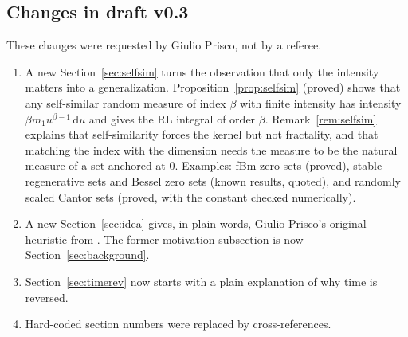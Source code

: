 \documentclass[11pt]{article}
\theoremstyle{remark}
\theoremstyle{definition}
\newcommand{\dd}{\,\mathrm{d}}
\begin{document}
\subsection{Changes in draft v0.3}\label{app:v03}
These changes were requested by Giulio Prisco, not by a referee.
\begin{enumerate}
\item A new Section~\ref{sec:selfsim} turns the observation that only the intensity matters into a generalization. Proposition~\ref{prop:selfsim} (proved) shows that any self-similar random measure of index $\beta$ with finite intensity has intensity $\beta m_1u^{\beta-1}\dd u$ and gives the RL integral of order $\beta$. Remark~\ref{rem:selfsim} explains that self-similarity forces the kernel but not fractality, and that matching the index with the dimension needs the measure to be the natural measure of a set anchored at $0$. Examples: fBm zero sets (proved), stable regenerative sets and Bessel zero sets (known results, quoted), and randomly scaled Cantor sets (proved, with the constant checked numerically).
\item A new Section~\ref{sec:idea} gives, in plain words, Giulio Prisco's original heuristic from \cite{Pri26,fracturlab}. The former motivation subsection is now Section~\ref{sec:background}.
\item Section~\ref{sec:timerev} now starts with a plain explanation of why time is reversed.
\item Hard-coded section numbers were replaced by cross-references.
\end{enumerate}
\end{document}

